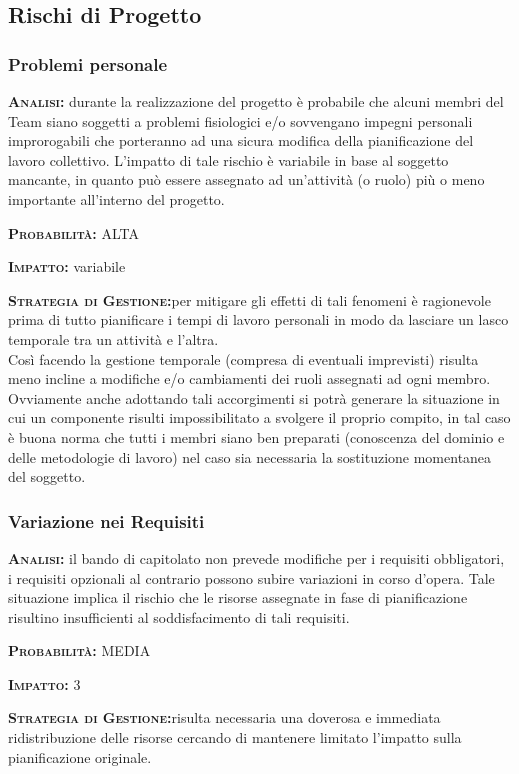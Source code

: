 \subsection{Rischi di Progetto}
\subsubsection{Problemi personale}
\begin{description}
	\item{\scshape\bfseries Analisi:} durante la realizzazione del progetto è probabile che alcuni membri del Team siano soggetti a problemi fisiologici e/o sovvengano impegni personali improrogabili che porteranno ad una sicura modifica della pianificazione del lavoro collettivo. L'impatto di tale rischio è variabile in base al soggetto mancante, in quanto può essere assegnato ad un'attività (o ruolo) più o meno importante all'interno del progetto.
	\item{\scshape\bfseries Probabilità:} ALTA
	\item{\scshape\bfseries Impatto:} variabile
	\item{\scshape\bfseries Strategia di Gestione:}per mitigare gli effetti di tali fenomeni è ragionevole prima di tutto pianificare i tempi di lavoro personali in modo da lasciare un lasco temporale tra un attività e l'altra.\\ 
Così facendo la gestione temporale (compresa di eventuali imprevisti) risulta meno incline a modifiche e/o cambiamenti dei ruoli assegnati ad ogni membro. Ovviamente anche adottando tali accorgimenti si potrà generare la situazione in cui un componente risulti impossibilitato a svolgere il proprio compito, in tal caso è buona norma che tutti i membri siano ben preparati (conoscenza del dominio e delle metodologie di lavoro) nel caso sia necessaria la sostituzione momentanea del soggetto.
\end{description}

\subsubsection{Variazione nei Requisiti}
\begin{description}
	\item{\scshape\bfseries Analisi:} il bando di capitolato non prevede modifiche per i requisiti obbligatori, i requisiti opzionali al contrario possono subire variazioni in corso d'opera. Tale situazione implica il rischio che le risorse assegnate in fase di pianificazione risultino insufficienti al soddisfacimento di tali requisiti.
	\item{\scshape\bfseries Probabilità:} MEDIA
	\item{\scshape\bfseries Impatto:} 3
	\item{\scshape\bfseries Strategia di Gestione:}risulta necessaria una doverosa e immediata ridistribuzione delle risorse cercando di mantenere limitato l'impatto sulla pianificazione originale.
\end{description}

